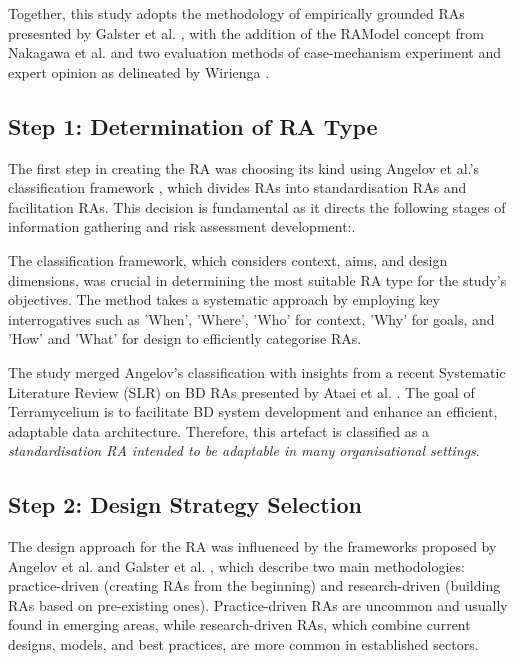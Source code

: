 \documentclass[review]{elsarticle}
\begin{document}
Together, this study adopts the methodology of empirically grounded RAs presesnted by Galster et al. \cite{GALSTER2011Empirically}, with the addition of the RAModel concept from Nakagawa et al. \cite{nakagawa2012ramodel} and two evaluation methods of case-mechanism experiment and expert opinion as delineated by Wirienga \cite{wieringa2014design}. 

\subsection{Step 1: Determination of RA Type}

The first step in creating the RA was choosing its kind using Angelov et al.'s classification framework \cite{angelov2009classification}, which divides RAs into standardisation RAs and facilitation RAs. This decision is fundamental as it directs the following stages of information gathering and risk assessment development:. 

The classification framework, which considers context, aims, and design dimensions, was crucial in determining the most suitable RA type for the study's objectives. The method takes a systematic approach by employing key interrogatives such as 'When', 'Where', 'Who' for context, 'Why' for goals, and 'How' and 'What' for design to efficiently categorise RAs.

The study merged Angelov's classification with insights from a recent Systematic Literature Review (SLR) on BD RAs presented by Ataei et al. \cite{ataei2022state}. The goal of Terramycelium is to facilitate BD system development and enhance an efficient, adaptable data architecture. Therefore, this artefact is classified as a \emph{standardisation RA intended to be adaptable in many organisational settings}.

\subsection{Step 2: Design Strategy Selection}

The design approach for the RA was influenced by the frameworks proposed by Angelov et al. \cite{angelov2012framework} and Galster et al. \cite{GALSTER2011Empirically}, which describe two main methodologies: practice-driven (creating RAs from the beginning) and research-driven (building RAs based on pre-existing ones). Practice-driven RAs are uncommon and usually found in emerging areas, while research-driven RAs, which combine current designs, models, and best practices, are more common in established sectors.
\end{document}

